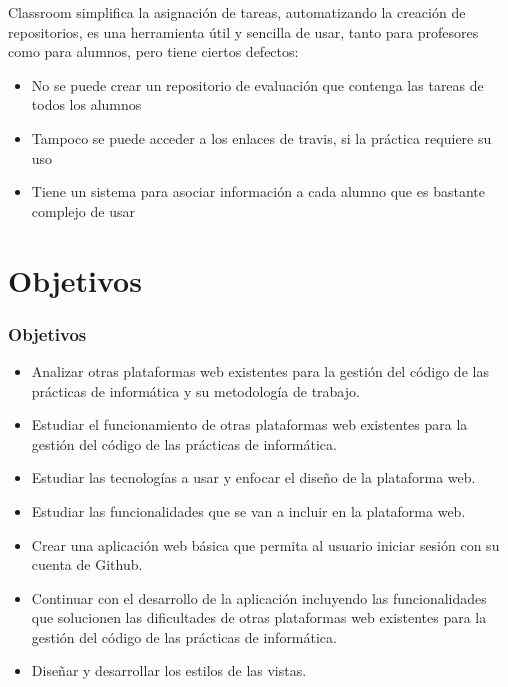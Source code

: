 \documentclass{beamer}
\begin{document}
\begin{frame}
  \framebreak
    Classroom simplifica la asignación de tareas, automatizando la creación de repositorios, 
    es una herramienta útil y sencilla de usar, tanto para profesores como para alumnos, 
    pero tiene ciertos defectos:

    \begin{itemize}
      \item No se puede crear un repositorio de evaluación que contenga las tareas de todos los alumnos
      \item Tampoco se puede acceder a los enlaces de travis, si la práctica requiere su uso
      \item Tiene un sistema para asociar información a cada alumno que es bastante complejo de usar
    \end{itemize}

  \framebreak
    
\end{frame}

\section{Objetivos}
\begin{frame}
  \frametitle{Objetivos}
  
  \begin{itemize}
    \item Analizar otras plataformas  web existentes para la gestión del código de las prácticas de informática y su metodología de trabajo.
    \item Estudiar el funcionamiento de otras plataformas  web existentes para la gestión del código de las prácticas de informática.
    \item Estudiar las tecnologías a usar y enfocar el diseño de la plataforma web.
    \item Estudiar las funcionalidades que se van a incluir en la plataforma web.
  \end{itemize}

  \framebreak

  \begin{itemize}
    \item Crear una aplicación web básica que permita al usuario iniciar sesión con su cuenta de Github.
    \item Continuar con el desarrollo de la aplicación incluyendo las funcionalidades que solucionen las dificultades de otras plataformas  web existentes para la gestión del código de las prácticas de informática.
    \item Diseñar y desarrollar los estilos de las vistas.
  \end{itemize}
  
\end{frame}
\end{document}
